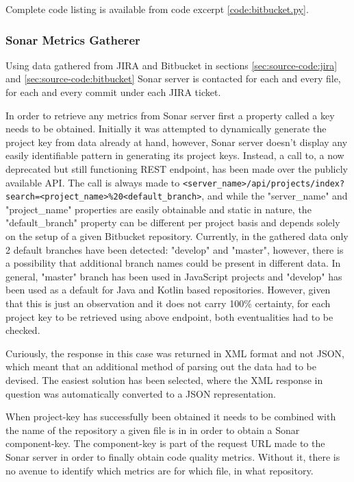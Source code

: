 Complete code listing is available from code excerpt \ref{code:bitbucket.py}.
 
\subsubsection{Sonar Metrics Gatherer}\label{sec:source-code:sonar-metrics}
Using data gathered from JIRA and Bitbucket in sections \ref{sec:source-code:jira} and \ref{sec:source-code:bitbucket} Sonar server is contacted for each and every file, for each and every commit under each JIRA ticket. 

In order to retrieve any metrics from Sonar server first a property called a key needs to be obtained. Initially it was attempted to dynamically generate the project key from data already at hand, however, Sonar server doesn't display any easily identifiable pattern in generating its project keys. Instead, a call to, a now deprecated but still functioning REST endpoint, has been made over the publicly available API. 
The call is always made to \texttt{<server_name>/api/projects/index?search=<project_name>\%20<default_branch>}, and while the "server\_name" and "project\_name" properties are easily obtainable and static in nature, the "default\_branch" property can be different per project basis and depends solely on the setup of a given Bitbucket repository. Currently, in the gathered data only 2 default branches have been detected: "develop" and "master", however, there is a possibility that additional branch names could be present in different data. In general, "master" branch has been used in JavaScript projects and "develop" has been used as a default for Java and Kotlin based repositories. However, given that this is just an observation and it does not carry 100\% certainty, for each project key to be retrieved using above endpoint, both eventualities had to be checked. 

Curiously, the response in this case was returned in XML format and not JSON, which meant that an additional method of parsing out the data had to be devised. 
The easiest solution has been selected, where the XML response in question was automatically converted to a JSON representation. 

When project-key has successfully been obtained it needs to be combined with the name of the repository a given file is in in order to obtain a Sonar component-key. The component-key is part of the request URL made to the Sonar server in order to finally obtain code quality metrics. Without it, there is no avenue to identify which metrics are for which file, in what repository.

